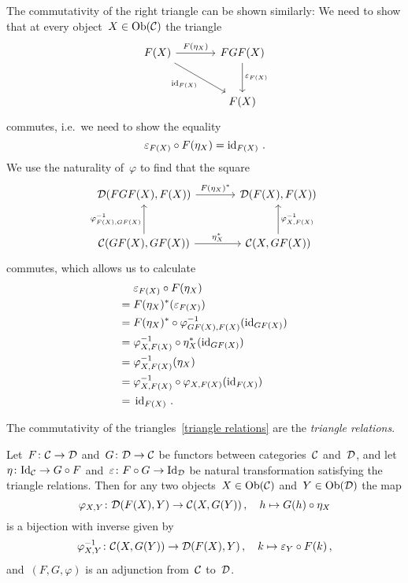 \begin{remark}[continues = triangle equalities]
\begin{enumerate}[start=3]
    The commutativity of the right triangle can be shown similarly:
    We need to show that at every object~$X \in \operatorname{Ob}(\mathcal{C})$ the triangle
    \[
      \begin{tikzcd}[sep = large]
          F(X)
          \arrow{r}[above]{F(\eta_X)}
          \arrow{dr}[below left]{\id_{F(X)}}
        & FGF(X)
          \arrow{d}[right]{\varepsilon_{F(X)}}
        \\
          {}
        & F(X)
      \end{tikzcd}
    \]
    commutes, i.e.\ we need to show the equality
    \[
        \varepsilon_{F(X)} \circ F(\eta_X)
      = \operatorname{id}_{F(X)} \,.
    \]
    We use the naturality of~$\varphi$ to find that the square
    \[
      \begin{tikzcd}[sep = large]
          \Dcat(FGF(X), F(X))
          \arrow{r}[above]{F(\eta_X)^*}
        & \Dcat(F(X),F(X))
        \\
          \Ccat(GF(X), GF(X))
          \arrow{u}[left]{\varphi_{F(X),GF(X)}^{-1}}
          \arrow{r}[above]{\eta_X^*}
        & \Ccat(X,GF(X))
          \arrow{u}[right]{\varphi_{X,F(X)}^{-1}}
      \end{tikzcd}
    \]
    commutes, which allows us to calculate
    \begin{align*}
       {}&  \varepsilon_{F(X)} \circ F(\eta_X)  \\
      ={}&  F(\eta_X)^*( \varepsilon_{F(X)} ) \\
      ={}&  F(\eta_X)^* \circ \varphi_{GF(X),F(X)}^{-1}( \operatorname{id}_{GF(X)} )  \\
      ={}&  \varphi_{X,F(X)}^{-1} \circ \eta_X^*( \operatorname{id}_{GF(X)} ) \\
      ={}&  \varphi_{X,F(X)}^{-1}( \eta_X ) \\
      ={}&  \varphi_{X,F(X)}^{-1} \circ \varphi_{X,F(X)}( \operatorname{id}_{F(X)} ) \\
      ={}&  \operatorname{id}_{F(X)} \,.
    \end{align*}
    
    The commutativity of the triangles~\eqref{triangle relations} are the \emph{triangle relations}.
  \end{enumerate}
\end{remark}


\begin{proposition}
  Let~$F \colon \mathcal{C} \to \mathcal{D}$ and~$G \colon \mathcal{D} \to \mathcal{C}$ be functors between categories~$\mathcal{C}$ and~$\mathcal{D}$, and let~$\eta \colon \mathrm{Id}_{\mathcal{C}} \to G \circ F$ and~$\varepsilon \colon F \circ G \to \mathrm{Id}_{\mathcal{D}}$ be natural transformation satisfying the triangle relations.
  Then for any two objects~$X \in \operatorname{Ob}(\mathcal{C})$ and~$Y \in \operatorname{Ob}(\mathcal{D})$ the map
  \[
            \varphi_{X,Y}
    \colon  \mathcal{D}(F(X), Y)
    \to     \mathcal{C}(X, G(Y)) \,,
    \quad   h
    \mapsto G(h) \circ \eta_X
  \]
   is a bijection with inverse given by
  \[
            \varphi_{X,Y}^{-1}
    \colon  \mathcal{C}(X, G(Y))
    \to     \mathcal{D}(F(X), Y) \,,
    \quad   k
    \mapsto \varepsilon_Y \circ F(k) \,,
  \]
  and~$(F,G,\varphi)$ is an adjunction from~$\mathcal{C}$ to~$\mathcal{D}$.
\end{proposition}


